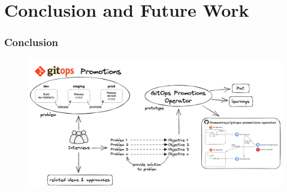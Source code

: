 \documentclass{beamer}
\begin{document}
\section{Conclusion and Future Work}

\begin{frame}
\frametitle{Conclusion}

\begin{figure}[h]
	\centering
	\includegraphics[width=1.0\linewidth]{assets/conclusion-gitops-thesis-2.png}
	\label{fig:conclusion-gitops-thesis-2}	
\end{figure}

	
\end{frame}
\end{document}
